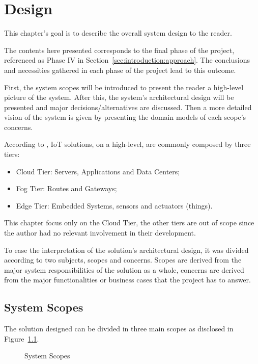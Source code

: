\chapter{Design}
\label{chap:design}

This chapter's goal is to describe the overall system design to the reader.

The contents here presented corresponds to the final phase of the project, referenced as Phase IV in Section~\ref{sec:introduction:approach}. The conclusions and necessities gathered in each phase of the project lead to this outcome. 

First, the system scopes will be introduced to present the reader a high-level picture of the system. After this, the system's architectural design will be presented and major decisions/alternatives are discussed. Then a more detailed vision of the system is given by presenting the domain models of each scope's concerns.

According to \cite{DIAS2022100529}, \gls{IoT} solutions, on a high-level, are commonly composed by three tiers:

\begin{itemize}
   \item Cloud Tier: Servers, Applications and Data Centers;
   \item Fog Tier: Routes and Gateways;
   \item Edge Tier: Embedded Systems, sensors and actuators (things).
\end{itemize}

This chapter focus only on the Cloud Tier, the other tiers are out of scope since the author had no relevant involvement in their development.

To ease the interpretation of the solution's architectural design, it was divided according to two subjects, scopes and concerns.
Scopes are derived from the major system responsibilities of the solution as a whole, concerns are derived from the major functionalities or business cases that the project has to answer.

\section{System Scopes}
\label{sec:design:system_scopes}

The solution designed can be divided in three main scopes as disclosed in Figure~\ref{fig:design:system_scopes:scopes}.

\begin{figure}[H]
    \centering
   \resizebox{\columnwidth}{!}
   {
      
   }
   \caption[System Scopes]{System Scopes}
   \label{fig:design:system_scopes:scopes}
\end{figure}

